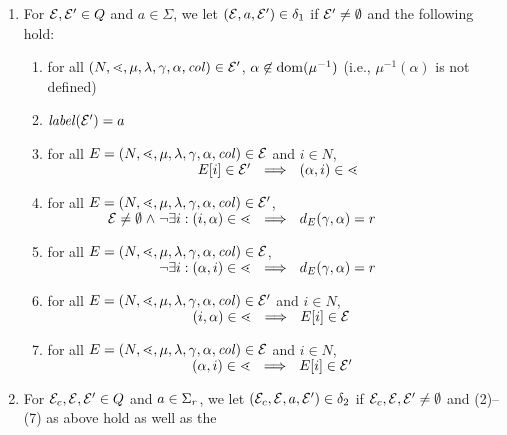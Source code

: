 \documentclass{LMCS}
\begin{document}
\begin{enumerate}[$\bullet$]\itemsep=1ex
\item For $\mathcal{E},\mathcal{E}' \in Q$ and $a \in \Sigma$, we let
  $(\mathcal{E},a,\mathcal{E}') \in \delta_1$ if $\mathcal{E}' \neq \emptyset$ and the
  following hold:\vspace{0.8ex}
\begin{enumerate}[(1)]\itemsep=0.8ex
\item for all $(N,\mathord{\lessdot},\mu,\lambda,\gamma,\alpha,\mathit{col}) \in \mathcal{E}'$,
  $\alpha \not\in \mathrm{dom}(\mu^{-1})$ (i.e., $\mu^{-1}(\alpha)$ is not defined)
\item $\mathit{label}(\mathcal{E}') = a$
\item for all $E=(N,\mathord{\lessdot},\mu,\lambda,\gamma,\alpha,\mathit{col}) \in \mathcal{E}$
  and $i \in N$,\vspace{0.5ex}\\
  ${\parbox{14.5em}{\hfill$E[i] \in \State'$}} ~~\Longrightarrow~~ (\alpha,i)
  \in \succord$
\item for all $E=(N,\mathord{\lessdot},\mu,\lambda,\gamma,\alpha,\mathit{col}) \in
  \mathcal{E}'$,\vspace{0.5ex}\\
  ${\parbox{14.5em}{\hfill$\State \neq \emptyset \mathrel{\wedge} \neg\exists
      i: (i,\alpha) \in \succord$}} ~~\Longrightarrow~~
  d_E(\gamma,\alpha)=\radius$
\item for all $E=(N,\mathord{\lessdot},\mu,\lambda,\gamma,\alpha,\mathit{col}) \in
  \mathcal{E}$,\vspace{0.5ex}\\
  ${\parbox{14.5em}{\hfill$\neg\exists i: (\alpha,i) \in \succord$}}
  ~~\Longrightarrow~~ d_E(\gamma,\alpha)=\radius$
\item for all $E=(N,\mathord{\lessdot},\mu,\lambda,\gamma,\alpha,\mathit{col}) \in
  \mathcal{E}'$ and $i \in N$,\vspace{0.5ex}\\ ${\parbox{14.5em}{\hfill$(i,\alpha)
      \in \succord$}} ~~\Longrightarrow~~ E[i] \in \State$
\item for all $E=(N,\mathord{\lessdot},\mu,\lambda,\gamma,\alpha,\mathit{col}) \in \mathcal{E}$
  and $i \in N$,\vspace{0.5ex}\\
  ${\parbox{14.5em}{\hfill$(\alpha,i) \in \succord$}} ~~\Longrightarrow~~ E[i]
  \in \State'$
\end{enumerate}
\item For $\mathcal{E}_c,\mathcal{E},\mathcal{E}' \in Q$ and $a \in \Sigma_r$, we let
  $(\mathcal{E}_c,\mathcal{E},a,\mathcal{E}') \in \delta_2$ if $\mathcal{E}_c,\mathcal{E},\mathcal{E}' \neq
  \emptyset$ and (2)--(7) as above hold as well as the

\end{enumerate}
\end{document}
